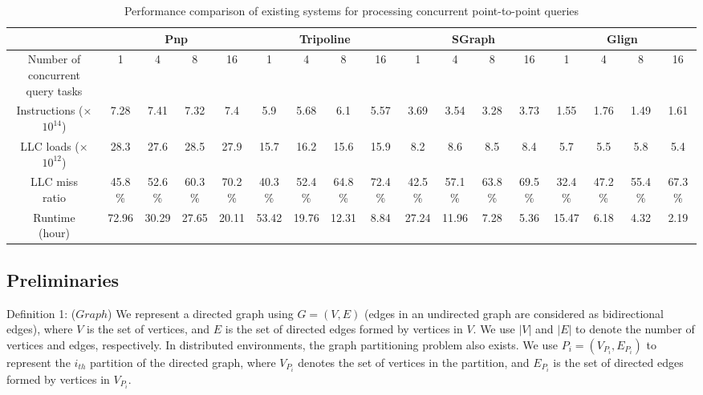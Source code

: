 \documentclass[lettersize,journal]{IEEEtran} %
\begin{document}
\begin{table}
  \centering
  \renewcommand\arraystretch{1.5}
  \tabcolsep=0.02cm
  \tiny
  
  \begin{tabular}{|c|c|c|c|c|c|c|c|c|c|c|c|c|c|c|c|c|}
    \hline
    \rule{0pt}{8pt} 
    \multirow{1}{*}{System} & \multicolumn{4}{c|}{Pnp} & \multicolumn{4}{c|}{Tripoline} & \multicolumn{4}{c|}{SGraph} & \multicolumn{4}{c|}{Glign} \\
    \hline
    \rule{0pt}{11pt} 
    \makecell{Number of \\ concurrent \\ query tasks} & 1 & 4 & 8 & 16  & 1 & 4 & 8 & 16 & 1 & 4 & 8 & 16 & 1 & 4 & 8 & 16 \\
    \hline
    \rule{0pt}{9pt} 
    \makecell{Instructions \\ (×$10^{14}$)} & 7.28 & 7.41 & 7.32 & 7.4 & 5.9 & 5.68 & 6.1 & 5.57 & 3.69 & 3.54 & 3.28 & 3.73 & 1.55 & 1.76 & 1.49 & 1.61 \\
    \hline
    \rule{0pt}{9pt} 
    \makecell{LLC loads \\ (×$10^{12}$)} & 28.3 & 27.6 & 28.5 & 27.9 & 15.7 & 16.2 & 15.6 & 15.9 & 8.2 & 8.6 & 8.5 & 8.4 & 5.7 & 5.5 & 5.8 & 5.4 \\
    \hline
    \rule{0pt}{9pt} 
    \makecell{LLC miss \\ ratio} & 45.8\% & 52.6\% & 60.3\% & 70.2\% & 40.3\% & 52.4\% & 64.8\% & 72.4\% & 42.5\% & 57.1\% & 63.8\% & 69.5\% & 32.4\% & 47.2\% & 55.4\% & 67.3\% \\
    \hline
    \rule{0pt}{9pt} 
    \makecell{Runtime \\ (hour)} & 72.96 & 30.29 & 27.65 & 20.11 & 53.42 & 19.76 & 12.31 & 8.84 & 27.24 & 11.96 & 7.28 & 5.36 & 15.47 & 6.18 & 4.32 & 2.19 \\
    \hline
  \end{tabular}
  \caption{Performance comparison of existing systems for processing concurrent point-to-point queries}
  \label{System_comparison}
\end{table}



\subsection{Preliminaries}
Definition 1: ($Graph$) We represent a directed graph using $G=(V, E)$ (edges in an undirected graph are considered as bidirectional edges), where $V$ is the set of vertices, and $E$ is the set of directed edges formed by vertices in $V$. We use $|V|$ and $|E|$ to denote the number of vertices and edges, respectively. In distributed environments, the graph partitioning problem also exists. We use $P_i=(V_{P_i}, E_{P_i})$ to represent the $i_{th}$ partition of the directed graph, where $V_{P_i}$ denotes the set of vertices in the partition, and $E_{P_i}$ is the set of directed edges formed by vertices in $V_{P_i}$.
\end{document}
